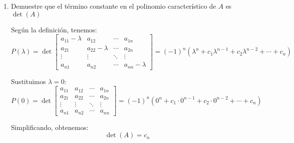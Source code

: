 \documentclass{report}
\begin{document}
\begin{enumerate}
        \item Demuestre que el término constante en el polinomio característico de $A$ es $\det(A)$
        
        Según la definición, tenemos:
        \[
        P(\lambda) = \det\left[\begin{array}{cccc}
        a_{11}-\lambda & a_{12} & \cdots & a_{1n} \\
        a_{21} & a_{22}-\lambda & \cdots & a_{2n} \\
        \vdots & \vdots & \ddots & \vdots \\
        a_{n1} & a_{n2} & \cdots & a_{nn}-\lambda
        \end{array}\right] = (-1)^n(\lambda^n + c_1\lambda^{n-1} + c_2\lambda^{n-2} + \cdots + c_n)
        \]

        Sustituimos \( \lambda = 0 \):
        \[
        P(0) = \det\left[\begin{array}{cccc}
        a_{11} & a_{12} & \cdots & a_{1n} \\
        a_{21} & a_{22} & \cdots & a_{2n} \\
        \vdots & \vdots & \ddots & \vdots \\
        a_{n1} & a_{n2} & \cdots & a_{nn}
        \end{array}\right] = (-1)^n(0^n + c_1\cdot 0^{n-1} + c_2\cdot 0^{n-2} + \cdots + c_n)
        \]

        Simplificando, obtenemos:
        \[
        \det(A) = c_n
        \]
    \end{enumerate}
\end{document}
